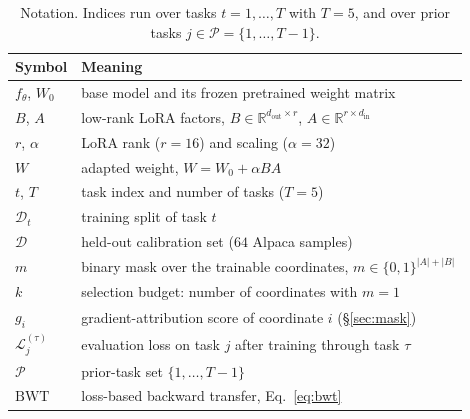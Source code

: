 \begin{table}[t]
\caption{Notation. Indices run over tasks $t = 1, \dots, T$ with $T = 5$, and over prior tasks $j \in \mathcal{P} = \{1, \dots, T-1\}$.}
\label{tab:notation}
\centering
\small
\begin{tabular}{@{}ll@{}}
\toprule
\textbf{Symbol} & \textbf{Meaning} \\
\midrule
$f_\theta$, $W_0$ & base model and its frozen pretrained weight matrix \\
$B$, $A$ & low-rank LoRA factors, $B \in \mathbb{R}^{d_{\text{out}} \times r}$, $A \in \mathbb{R}^{r \times d_{\text{in}}}$ \\
$r$, $\alpha$ & LoRA rank ($r = 16$) and scaling ($\alpha = 32$) \\
$W$ & adapted weight, $W = W_0 + \alpha BA$ \\
$t$, $T$ & task index and number of tasks ($T = 5$) \\
$\mathcal{D}_t$ & training split of task $t$ \\
$\mathcal{D}$ & held-out calibration set ($64$ Alpaca samples) \\
$m$ & binary mask over the trainable coordinates, $m \in \{0,1\}^{|A|+|B|}$ \\
$k$ & selection budget: number of coordinates with $m = 1$ \\
$g_i$ & gradient-attribution score of coordinate $i$ (\S\ref{sec:mask}) \\
$\mathcal{L}_j^{(\tau)}$ & evaluation loss on task $j$ after training through task $\tau$ \\
$\mathcal{P}$ & prior-task set $\{1, \dots, T-1\}$ \\
$\mathrm{BWT}$ & loss-based backward transfer, Eq.~\eqref{eq:bwt} \\
\bottomrule
\end{tabular}
\end{table}





